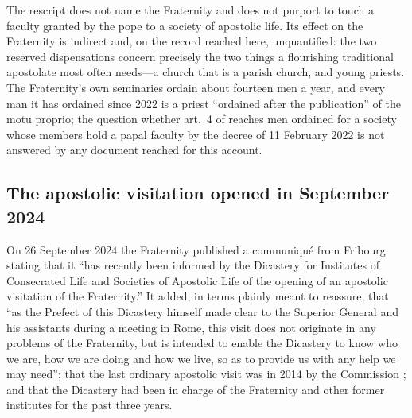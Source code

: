 The rescript does not name the Fraternity and does not purport to touch a
faculty granted by the pope to a society of apostolic life. Its effect on
the Fraternity is indirect and, on the record reached here, unquantified:
the two reserved dispensations concern precisely the two things a
flourishing traditional apostolate most often needs---a church that is a
parish church, and young priests. The Fraternity's own seminaries ordain
about fourteen men a year, and every man it has ordained since 2022 is a
priest ``ordained after the publication'' of the motu proprio; the
question whether art.~4 of  reaches men
ordained for a society whose members hold a papal faculty by the decree of
11 February 2022 is not answered by any document reached for this
account.

\subsection{The apostolic visitation opened in September 2024}

On 26 September 2024 the Fraternity published a communiqué from Fribourg
stating that it ``has recently been informed by the Dicastery for
Institutes of Consecrated Life and Societies of Apostolic Life of the
opening of an apostolic visitation of the Fraternity.'' It added, in
terms plainly meant to reassure, that ``as the Prefect of this Dicastery
himself made clear to the Superior General and his assistants during a
meeting in Rome, this visit does not originate in any problems of the
Fraternity, but is intended to enable the Dicastery to know who we are,
how we are doing and how we live, so as to provide us with any help we may
need''; that the last ordinary apostolic visit was in 2014 by the
Commission ; and that the Dicastery had been in charge
of the Fraternity and other former  institutes for the
past three years.

